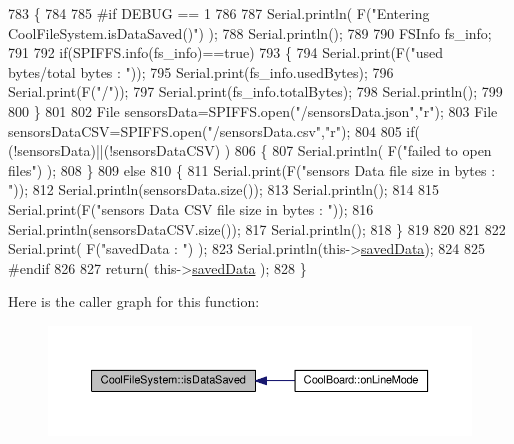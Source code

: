 \begin{DoxyCode}
783 \{
784 
785 \textcolor{preprocessor}{#if DEBUG == 1 }
786 
787     Serial.println( F(\textcolor{stringliteral}{"Entering CoolFileSystem.isDataSaved()"}) );
788     Serial.println();
789 
790     FSInfo fs\_info;
791 
792     \textcolor{keywordflow}{if}(SPIFFS.info(fs\_info)==\textcolor{keyword}{true})
793     \{
794         Serial.print(F(\textcolor{stringliteral}{"used bytes/total bytes : "}));   
795         Serial.print(fs\_info.usedBytes);
796         Serial.print(F(\textcolor{stringliteral}{"/"}));
797         Serial.print(fs\_info.totalBytes);
798         Serial.println();
799 
800     \}
801 
802     File sensorsData=SPIFFS.open(\textcolor{stringliteral}{"/sensorsData.json"},\textcolor{stringliteral}{"r"});
803     File sensorsDataCSV=SPIFFS.open(\textcolor{stringliteral}{"/sensorsData.csv"},\textcolor{stringliteral}{"r"});
804     
805     \textcolor{keywordflow}{if}( (!sensorsData)||(!sensorsDataCSV) ) 
806     \{
807         Serial.println( F(\textcolor{stringliteral}{"failed to open files"}) );        
808     \}
809     \textcolor{keywordflow}{else}
810     \{       
811             Serial.print(F(\textcolor{stringliteral}{"sensors Data file size in bytes : "}));
812             Serial.println(sensorsData.size());
813             Serial.println();
814             
815             Serial.print(F(\textcolor{stringliteral}{"sensors Data CSV file size in bytes : "}));              
816             Serial.println(sensorsDataCSV.size());
817             Serial.println();
818     \}
819 
820 
821 
822     Serial.print( F(\textcolor{stringliteral}{"savedData : "}) );
823     Serial.println(this->\hyperlink{class_cool_file_system_ad9f5b739a32100f5f21270c3d9ee2b1d}{savedData});
824 
825 \textcolor{preprocessor}{#endif}
826 
827     \textcolor{keywordflow}{return}( this->\hyperlink{class_cool_file_system_ad9f5b739a32100f5f21270c3d9ee2b1d}{savedData} );
828 \}
\end{DoxyCode}
Here is the caller graph for this function\+:\nopagebreak
\begin{figure}[H]
\begin{center}
\leavevmode
\includegraphics[width=350pt]{db/d0c/class_cool_file_system_ac86a40e7c3a1842f7342f698d34324f9_icgraph}
\end{center}
\end{figure}
\mbox{\label{class_cool_file_system_afa3a4feae94871d4d3b6bebb701c2e67}} 
